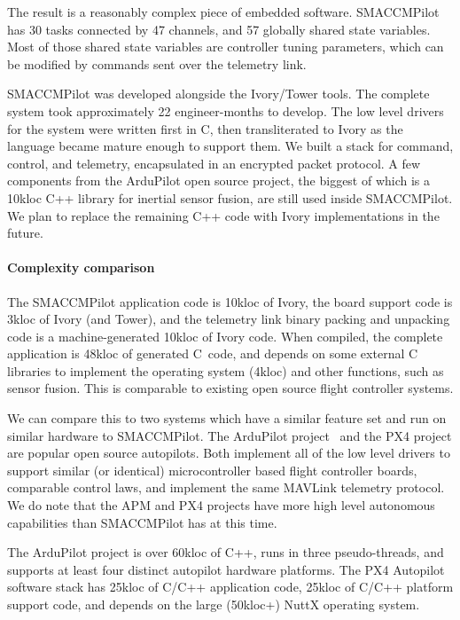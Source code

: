 The result is a reasonably complex piece of embedded software. SMACCMPilot has
30 tasks connected by 47 channels, and 57 globally shared state variables. Most
of those shared state variables are controller tuning parameters, which can be
modified by commands sent over the telemetry link.

SMACCMPilot was developed alongside the Ivory/Tower tools.  The complete system
took approximately 22 engineer-months to develop.  The low level drivers for the
system were written first in C, then transliterated to Ivory as the language
became mature enough to support them. We built a stack for command, control, and
telemetry, encapsulated in an encrypted packet protocol. A few components from
the ArduPilot open source project, the biggest of which is a 10kloc C++ library
for inertial sensor fusion, are still used inside SMACCMPilot. We plan to
replace the remaining C++ code with Ivory implementations in the future.

\paragraph{Complexity comparison}
The SMACCMPilot application code is 10kloc of Ivory, the board support code is
3kloc of Ivory (and Tower), and the telemetry link binary packing and unpacking
code is a machine-generated 10kloc of Ivory code. When compiled, the
complete application is 48kloc of generated C~code, and depends on some external
C libraries to implement the operating system (4kloc) and other functions, such
as sensor fusion.  This is comparable to existing open source flight
controller systems.

We can compare this to two systems which have a similar feature set and run on
similar hardware to SMACCMPilot.  The ArduPilot project~\cite{apm-proj} and the
PX4 project are popular open source autopilots. Both implement all
of the low level drivers to support similar (or identical) microcontroller based
flight controller boards, comparable control laws, and implement the same
MAVLink telemetry protocol. We do note that the APM and PX4 projects have more
high level autonomous capabilities than SMACCMPilot has at this time.

The ArduPilot project is over 60kloc of C++, runs in three pseudo-threads, and
supports at least four distinct autopilot hardware platforms. The PX4 Autopilot
software stack has 25kloc of C/C++ application code, 25kloc of C/C++ platform
support code, and depends on the large (50kloc+) NuttX operating system.

